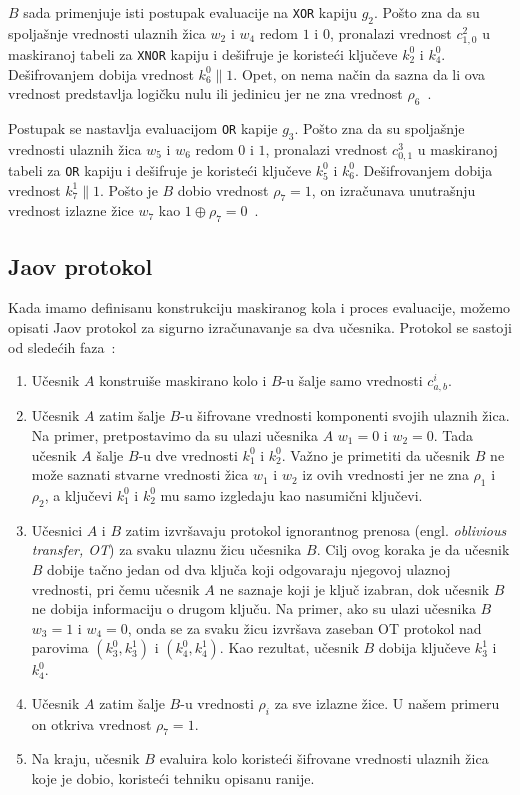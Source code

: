 $B$ sada primenjuje isti postupak evaluacije na \verb|XOR| kapiju $g_2$. Pošto zna da su spoljašnje vrednosti ulaznih žica $w_2$ i $w_4$ redom $1$ i $0$, pronalazi vrednost $c_{1,0}^2$ u maskiranoj tabeli za \verb|XNOR| kapiju i dešifruje je koristeći ključeve $k_2^0$ i $k_4^0$. Dešifrovanjem dobija vrednost $k_6^0\|1$. Opet, on nema način da sazna da li ova vrednost predstavlja logičku nulu ili jedinicu jer ne zna vrednost $\rho_6$~\cite{smart2016cryptography}.

Postupak se nastavlja evaluacijom \verb|OR| kapije $g_3$. Pošto zna da su spoljašnje vrednosti ulaznih žica $w_5$ i $w_6$ redom $0$ i $1$, pronalazi vrednost $c_{0,1}^3$ u maskiranoj tabeli za \verb|OR| kapiju i dešifruje je koristeći ključeve $k_5^0$ i $k_6^0$. Dešifrovanjem dobija vrednost $k_7^1\|1$. Pošto je $B$ dobio vrednost $\rho_7=1$, on izračunava unutrašnju vrednost izlazne žice $w_7$ kao $1\oplus \rho_7=0$~\cite{smart2016cryptography}. 


\subsection{Jaov protokol}

Kada imamo definisanu konstrukciju maskiranog kola i proces evaluacije, možemo opisati Jaov protokol za sigurno izračunavanje sa dva učesnika. Protokol se sastoji od sledećih faza~\cite{smart2016cryptography}:

\begin{enumerate}
    \item Učesnik $A$ konstruiše maskirano kolo i $B$-u šalje samo vrednosti $c_{a,b}^i$.
    \item Učesnik $A$ zatim šalje $B$-u šifrovane vrednosti komponenti svojih ulaznih žica. Na primer, pretpostavimo da su ulazi učesnika $A$ $w_1=0$ i $w_2=0$. Tada učesnik $A$ šalje $B$-u dve vrednosti $k_1^0$ i $k_2^0$. Važno je primetiti da učesnik $B$ ne može saznati stvarne vrednosti žica $w_1$ i $w_2$ iz ovih vrednosti jer ne zna $\rho_1$ i $\rho_2$, a ključevi $k_1^0$ i $k_2^0$ mu samo izgledaju kao nasumični ključevi.
    \item Učesnici $A$ i $B$ zatim izvršavaju protokol ignorantnog prenosa (engl. \textit{oblivious transfer, OT}) za svaku ulaznu žicu učesnika $B$. Cilj ovog koraka je da učesnik $B$ dobije tačno jedan od dva ključa koji odgovaraju njegovoj ulaznoj vrednosti, pri čemu učesnik $A$ ne saznaje koji je ključ izabran, dok učesnik $B$ ne dobija informaciju o drugom ključu. Na primer, ako su ulazi učesnika $B$ $w_3=1$ i $w_4=0$, onda se za svaku žicu izvršava zaseban OT protokol nad parovima $(k_3^0,k_3^1)$ i $(k_4^0,k_4^1)$. Kao rezultat, učesnik $B$ dobija ključeve $k_3^1$ i $k_4^0$.
    \item Učesnik $A$ zatim šalje $B$-u vrednosti $\rho_i$ za sve izlazne žice. U našem primeru on otkriva vrednost $\rho_7=1$.
    \item Na kraju, učesnik $B$ evaluira kolo koristeći šifrovane vrednosti ulaznih žica koje je dobio, koristeći tehniku opisanu ranije.
\end{enumerate}

